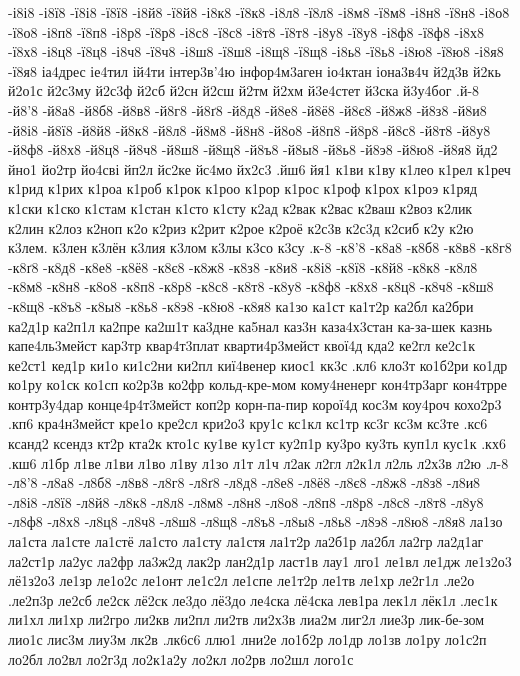 {{-і8і8
-і8ї8
-ї8і8
-ї8ї8
-і8й8
-ї8й8
-і8к8
-ї8к8
-і8л8
-ї8л8
-і8м8
-ї8м8
-і8н8
-ї8н8
-і8о8
-ї8о8
-і8п8
-ї8п8
-і8р8
-ї8р8
-і8с8
-ї8с8
-і8т8
-ї8т8
-і8у8
-ї8у8
-і8ф8
-ї8ф8
-і8х8
-ї8х8
-і8ц8
-ї8ц8
-і8ч8
-ї8ч8
-і8ш8
-ї8ш8
-і8щ8
-ї8щ8
-і8ь8
-ї8ь8
-і8ю8
-ї8ю8
-і8я8
-ї8я8
іа4дрес
іе4тил
ій4ти
інтер3в'4ю
інфор4м3аген
іо4ктан
іона3в4ч
й2д3в
й2кь
й2о1с
й2с3му
й2с3ф
й2сб
й2сн
й2сш
й2тм
й2хм
й3е4стет
й3ска
й3у4бог
.й-8
-й8'8
-й8а8
-й8б8
-й8в8
-й8г8
-й8ґ8
-й8д8
-й8е8
-й8ё8
-й8є8
-й8ж8
-й8з8
-й8и8
-й8і8
-й8ї8
-й8й8
-й8к8
-й8л8
-й8м8
-й8н8
-й8о8
-й8п8
-й8р8
-й8с8
-й8т8
-й8у8
-й8ф8
-й8х8
-й8ц8
-й8ч8
-й8ш8
-й8щ8
-й8ъ8
-й8ы8
-й8ь8
-й8э8
-й8ю8
-й8я8
йд2
йно1
йо2тр
йо4сві
йп2л
йс2ке
йс4мо
йх2с3
.йш6
йя1
к1ви
к1ву
к1лео
к1рел
к1реч
к1рид
к1рих
к1роа
к1роб
к1рок
к1роо
к1рор
к1рос
к1роф
к1рох
к1роэ
к1ряд
к1ски
к1ско
к1стам
к1стан
к1сто
к1сту
к2ад
к2вак
к2вас
к2ваш
к2воз
к2лик
к2лин
к2лоз
к2ноп
к2о
к2риз
к2рит
к2рое
к2роё
к2с3в
к2с3д
к2сиб
к2у
к2ю
к3лем.
к3лен
к3лён
к3лия
к3лом
к3лы
к3со
к3су
.к-8
-к8'8
-к8а8
-к8б8
-к8в8
-к8г8
-к8ґ8
-к8д8
-к8е8
-к8ё8
-к8є8
-к8ж8
-к8з8
-к8и8
-к8і8
-к8ї8
-к8й8
-к8к8
-к8л8
-к8м8
-к8н8
-к8о8
-к8п8
-к8р8
-к8с8
-к8т8
-к8у8
-к8ф8
-к8х8
-к8ц8
-к8ч8
-к8ш8
-к8щ8
-к8ъ8
-к8ы8
-к8ь8
-к8э8
-к8ю8
-к8я8
ка1зо
ка1ст
ка1т2р
ка2бл
ка2бри
ка2д1р
ка2п1л
ка2пре
ка2ш1т
ка3дне
ка5нал
каз3н
каза4х3стан
ка-за-шек
казнь
капе4ль3мейст
кар3тр
квар4т3плат
кварти4р3мейст
квої4д
кда2
ке2гл
ке2с1к
ке2ст1
кед1р
ки1о
ки1с2ни
ки2пл
киї4венер
киос1
кк3с
.кл6
кло3т
ко1б2ри
ко1др
ко1ру
ко1ск
ко1сп
ко2р3в
ко2фр
кольд-кре-мом
кому4ненерг
кон4тр3арг
кон4трре
контр3у4дар
конце4р4т3мейст
коп2р
корн-па-пир
корої4д
кос3м
коу4роч
кохо2р3
.кп6
кра4н3мейст
кре1о
кре2сл
кри2о3
кру1с
кс1кл
кс1тр
кс3г
кс3м
кс3те
.кс6
ксанд2
ксендз
кт2р
кта2к
кто1с
ку1ве
ку1ст
ку2п1р
ку3ро
ку3ть
куп1л
кус1к
.кх6
.кш6
л1бр
л1ве
л1ви
л1во
л1ву
л1зо
л1т
л1ч
л2ак
л2гл
л2к1л
л2ль
л2х3в
л2ю
.л-8
-л8'8
-л8а8
-л8б8
-л8в8
-л8г8
-л8ґ8
-л8д8
-л8е8
-л8ё8
-л8є8
-л8ж8
-л8з8
-л8и8
-л8і8
-л8ї8
-л8й8
-л8к8
-л8л8
-л8м8
-л8н8
-л8о8
-л8п8
-л8р8
-л8с8
-л8т8
-л8у8
-л8ф8
-л8х8
-л8ц8
-л8ч8
-л8ш8
-л8щ8
-л8ъ8
-л8ы8
-л8ь8
-л8э8
-л8ю8
-л8я8
ла1зо
ла1ста
ла1сте
ла1стё
ла1сто
ла1сту
ла1стя
ла1т2р
ла2б1р
ла2бл
ла2гр
ла2д1аг
ла2ст1р
ла2ус
ла2фр
ла3ж2д
лак2р
лан2д1р
ласт1в
лау1
лго1
ле1вл
ле1дж
ле1з2о3
лё1з2о3
ле1зр
ле1о2с
ле1онт
ле1с2л
ле1спе
ле1т2р
ле1тв
ле1хр
ле2г1л
.ле2о
.ле2п3р
ле2сб
ле2ск
лё2ск
ле3до
лё3до
ле4ска
лё4ска
лев1ра
лек1л
лёк1л
.лес1к
ли1хл
ли1хр
ли2гро
ли2кв
ли2пл
ли2тв
ли2х3в
лиа2м
лиг2л
лие3р
лик-бе-зом
лио1с
лис3м
лиу3м
лк2в
.лк6с6
ллю1
лни2е
ло1б2р
ло1др
ло1зв
ло1ру
ло1с2п
ло2бл
ло2вл
ло2г3д
ло2к1а2у
ло2кл
ло2рв
ло2шл
лого1с
}}
